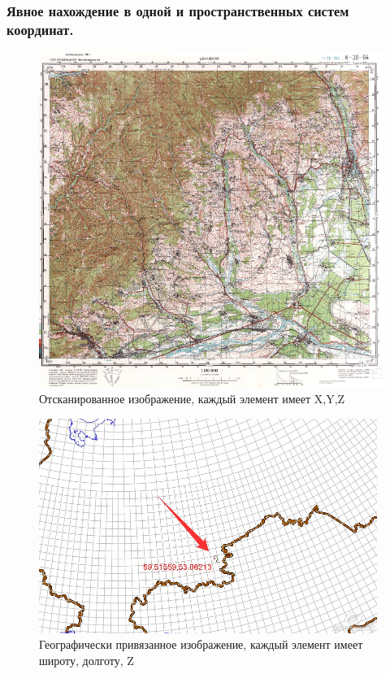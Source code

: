 \begin{frame}
    \frametitle{Явное нахождение в одной и пространственных систем координат.}
    \begin{multicols}{2}
       \begin{figure}[!ht]
           \begin{center}
               \includegraphics[width=0.8\columnwidth]{./introduction/img/topo_map}
           \end{center}
           \caption{Отсканированное изображение, каждый элемент имеет X,Y,Z}
       \end{figure}

       \begin{figure}[!ht]
           \begin{center}
               \includegraphics[width=0.95\columnwidth]{./introduction/img/grid_map}
           \end{center}
           \caption{Географически привязанное изображение, каждый элемент имеет широту, долготу, Z}
       \end{figure}
    \end{multicols}
\end{frame}

